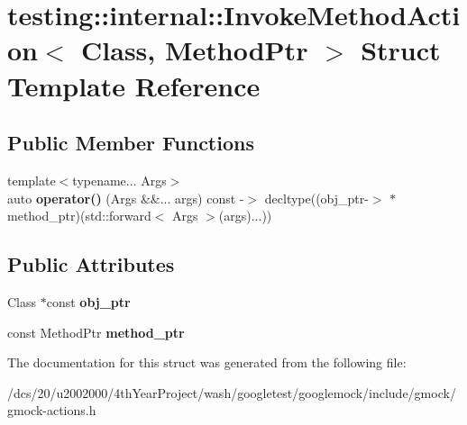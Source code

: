 \hypertarget{structtesting_1_1internal_1_1InvokeMethodAction}{}\section{testing\+:\+:internal\+:\+:Invoke\+Method\+Action$<$ Class, Method\+Ptr $>$ Struct Template Reference}
\label{structtesting_1_1internal_1_1InvokeMethodAction}
\subsection*{Public Member Functions}
\begin{DoxyCompactItemize}
\item 
\mbox{\label{structtesting_1_1internal_1_1InvokeMethodAction_a152a1d71805ff44a9ad9fcd01a506eb8}} 
{\footnotesize template$<$typename... Args$>$ }\\auto {\bfseries operator()} (Args \&\&... args) const -\/$>$ decltype((obj\+\_\+ptr-\/$>$ $\ast$method\+\_\+ptr)(std\+::forward$<$ Args $>$(args)...))
\end{DoxyCompactItemize}
\subsection*{Public Attributes}
\begin{DoxyCompactItemize}
\item 
\mbox{\label{structtesting_1_1internal_1_1InvokeMethodAction_a385b218f5e83060df70d56bc85699e9c}} 
Class $\ast$const {\bfseries obj\+\_\+ptr}
\item 
\mbox{\label{structtesting_1_1internal_1_1InvokeMethodAction_a3101d543f56f7d010fac4d8eaa03acfb}} 
const Method\+Ptr {\bfseries method\+\_\+ptr}
\end{DoxyCompactItemize}


The documentation for this struct was generated from the following file\+:\begin{DoxyCompactItemize}
\item 
/dcs/20/u2002000/4th\+Year\+Project/wash/googletest/googlemock/include/gmock/gmock-\/actions.\+h\end{DoxyCompactItemize}
